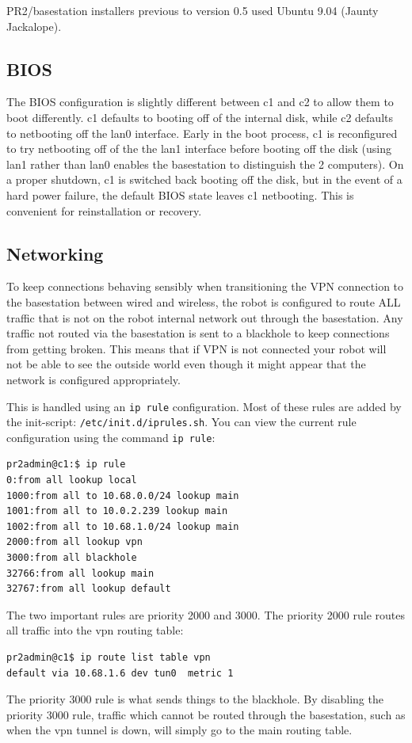 PR2/basestation installers previous to version 0.5 used Ubuntu 9.04
(Jaunty Jackalope). 

\subsection{BIOS}
The BIOS configuration is slightly different between c1 and c2 to
allow them to boot differently.  c1 defaults to booting off of the
internal disk, while c2 defaults to netbooting off the lan0 interface.
Early in the boot process, c1 is reconfigured to try netbooting off of
the the lan1 interface before booting off the disk (using lan1 rather
than lan0 enables the basestation to distinguish the 2 computers).  On
a proper shutdown, c1 is switched back booting off the disk, but in
the event of a hard power failure, the default BIOS state leaves c1
netbooting.  This is convenient for reinstallation or recovery.

\subsection{Networking}
To keep connections behaving sensibly when transitioning the VPN
connection to the basestation between wired and wireless, the robot is
configured to route ALL traffic that is not on the robot internal
network out through the basestation.  Any traffic not routed via the
basestation is sent to a blackhole to keep connections from getting
broken.  This means that if VPN is not connected your robot will not
be able to see the outside world even though it might appear that the
network is configured appropriately.

This is handled using an \texttt{ip rule} configuration.  Most of
these rules are added by the init-script:
\texttt{/etc/init.d/iprules.sh}.  You can view the current rule
configuration using the command \texttt{ip rule}:
\begin{verbatim}
pr2admin@c1:$ ip rule
0:from all lookup local 
1000:from all to 10.68.0.0/24 lookup main 
1001:from all to 10.0.2.239 lookup main 
1002:from all to 10.68.1.0/24 lookup main 
2000:from all lookup vpn 
3000:from all blackhole
32766:from all lookup main 
32767:from all lookup default
\end{verbatim}
The two important rules are priority 2000 and 3000.  The priority 2000
rule routes all traffic into the vpn routing table:
\begin{verbatim}
pr2admin@c1$ ip route list table vpn
default via 10.68.1.6 dev tun0  metric 1 
\end{verbatim}
The priority 3000 rule is what sends things to the blackhole.  By
disabling the priority 3000 rule, traffic which cannot be routed
through the basestation, such as when the vpn tunnel is down, will
simply go to the main routing table.


